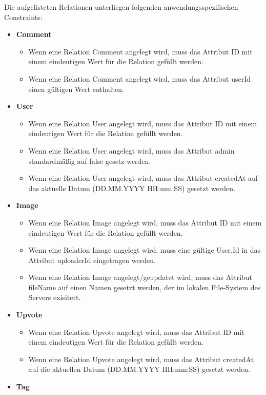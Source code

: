 \documentclass[12pt, oneside, a4paper]{article}		%
\begin{document}
Die aufgelisteten Relationen unterliegen folgenden anwendungsspezifischen Constraints:

\begin{itemize}
	\item \textbf{Comment}
	\begin{itemize}
		\item Wenn eine Relation Comment angelegt wird, muss das Attribut ID mit einem eindeutigen Wert für die Relation gefüllt werden.
		\item Wenn eine Relation Comment angelegt wird, muss das Attribut userId einen gültigen Wert enthalten.
	\end{itemize}
	\item \textbf{User}
	\begin{itemize}
		\item Wenn eine Relation User angelegt wird, muss das Attribut ID mit einem eindeutigen Wert für die Relation gefüllt werden.
		\item Wenn eine Relation User angelegt wird, muss das Attribut admin standardmäßig auf false gesetz werden.
		\item Wenn eine Relation User angelegt wird, muss das Attribut createdAt auf das aktuelle Datum (DD.MM.YYYY HH:mm:SS) gesetzt werden.
	\end{itemize}
	\item \textbf{Image}
	\begin{itemize}
		\item Wenn eine Relation Image angelegt wird, muss das Attribut ID mit einem eindeutigen Wert für die Relation gefüllt werden.
		\item Wenn eine Relation Image angelegt wird, muss eine gültige User.Id in das Attribut uploaderId eingetragen werden.
		\item Wenn eine Relation Image angelegt/geupdatet wird, muss das Attribut fileName auf einen Namen gesetzt werden, der im lokalen File-System des Servers exisitert.
	\end{itemize}
	\item \textbf{Upvote}
	\begin{itemize}
		\item Wenn eine Relation Upvote angelegt wird, muss das Attribut ID mit einem eindeutigen Wert für die Relation gefüllt werden.
		\item Wenn eine Relation Upvote angelegt wird, muss das Attribut createdAt auf die aktuellen Datum (DD.MM.YYYY HH:mm:SS) gesetzt werden.
	\end{itemize}
	\item \textbf{Tag}

\end{itemize}
\end{document}

